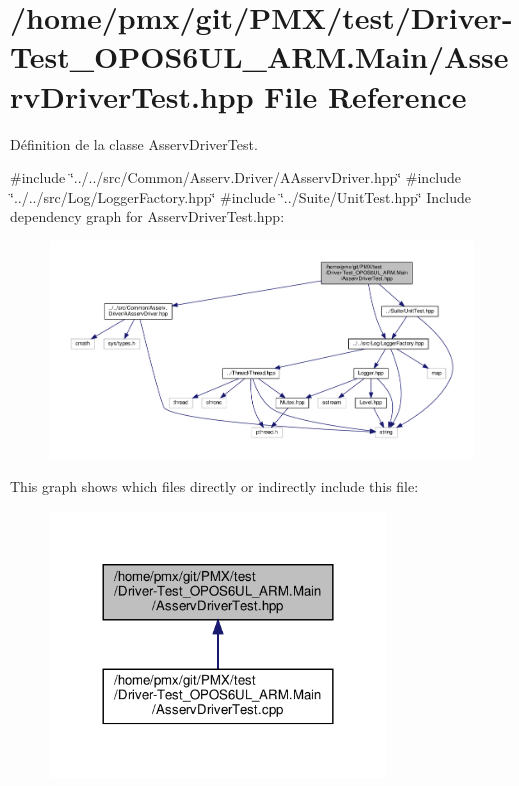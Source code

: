 \hypertarget{Driver-Test__OPOS6UL__ARM_8Main_2AsservDriverTest_8hpp}{}\section{/home/pmx/git/\+P\+M\+X/test/\+Driver-\/\+Test\+\_\+\+O\+P\+O\+S6\+U\+L\+\_\+\+A\+RM.Main/\+Asserv\+Driver\+Test.hpp File Reference}
\label{Driver-Test__OPOS6UL__ARM_8Main_2AsservDriverTest_8hpp}


Définition de la classe Asserv\+Driver\+Test.  


{\ttfamily \#include \char`\"{}../../src/\+Common/\+Asserv.\+Driver/\+A\+Asserv\+Driver.\+hpp\char`\"{}}\newline
{\ttfamily \#include \char`\"{}../../src/\+Log/\+Logger\+Factory.\+hpp\char`\"{}}\newline
{\ttfamily \#include \char`\"{}../\+Suite/\+Unit\+Test.\+hpp\char`\"{}}\newline
Include dependency graph for Asserv\+Driver\+Test.\+hpp\+:
\nopagebreak
\begin{figure}[H]
\begin{center}
\leavevmode
\includegraphics[width=350pt]{Driver-Test__OPOS6UL__ARM_8Main_2AsservDriverTest_8hpp__incl}
\end{center}
\end{figure}
This graph shows which files directly or indirectly include this file\+:
\nopagebreak
\begin{figure}[H]
\begin{center}
\leavevmode
\includegraphics[width=252pt]{Driver-Test__OPOS6UL__ARM_8Main_2AsservDriverTest_8hpp__dep__incl}
\end{center}
\end{figure}
